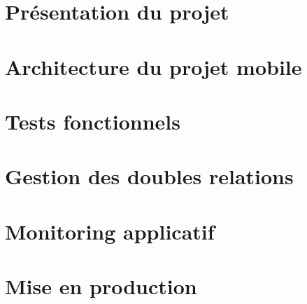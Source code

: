 
\section{Présentation du projet}
\label{prezAppNeuflize}
	
	
\section{Architecture du projet mobile}
	
	
\section{Tests fonctionnels}
	
	
\section{Gestion des doubles relations}
	
	
\section{Monitoring applicatif}
	

\section{Mise en production}
	